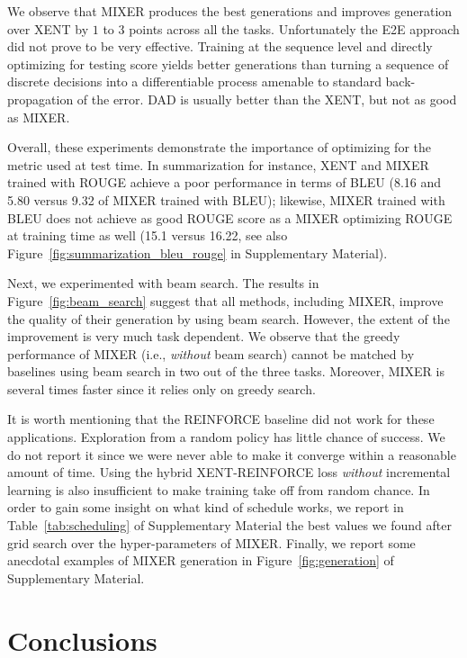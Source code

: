 \documentclass{article} \usepackage{iclr2016_conference,times}
\begin{document}
We observe that MIXER produces the best generations and improves generation over XENT by $1$ to $3$ points across all the tasks. 
Unfortunately the E2E approach did not prove to be very effective. Training at the sequence level and directly optimizing for testing score yields better generations than turning a sequence of discrete decisions into a differentiable process amenable to standard back-propagation of the error. 
DAD is usually better than the XENT, but not as good as MIXER.  

Overall, these experiments demonstrate the importance of optimizing for the metric used at test time. In summarization for instance, XENT and MIXER trained with ROUGE achieve a poor performance in terms of BLEU (8.16 and 5.80 versus 9.32 of MIXER trained with BLEU); likewise, MIXER trained with BLEU does not achieve as good ROUGE score as 
a MIXER optimizing ROUGE at training time as well (15.1 versus 16.22, see also Figure~\ref{fig:summarization_bleu_rouge} in Supplementary Material).

Next, we experimented with beam search. The results in Figure~\ref{fig:beam_search} suggest that all methods, including MIXER, improve the quality of their generation by using beam search. However, the extent of the improvement is very much task dependent. We observe that the greedy performance of MIXER (i.e., {\em without} beam search) cannot be matched by baselines using beam search in two out of the three tasks. Moreover, MIXER is several times faster since it relies only on greedy search.

It is worth mentioning that the REINFORCE baseline did not work for these applications. Exploration from a random policy has little chance of success. We do not report it since we were never able to make it converge within a reasonable amount of time. Using the hybrid XENT-REINFORCE loss {\em without} incremental learning is also insufficient to make training take off from random chance. In order to gain some insight on what kind of schedule works, we report in Table~\ref{tab:scheduling} of Supplementary Material the best values we found after grid search over the hyper-parameters of MIXER.
Finally, we report some anecdotal examples of MIXER generation in Figure~\ref{fig:generation} of Supplementary Material. 
 \section{Conclusions}
\end{document}
